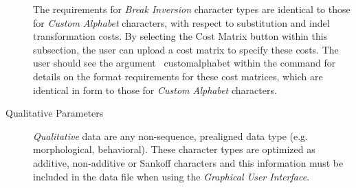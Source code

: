 \begin{description}
		\indent The requirements for \emph{Break Inversion} character types are identical to those for 
		 \emph{Custom Alphabet} characters, with respect to substitution and indel transformation costs. 
		 By selecting the Cost Matrix button within this subsection, the user can upload a 
		 cost matrix to specify these costs. The user should see the argument~
		 {customalphabet} within the command  for details on the format requirements 
		 for these cost matrices, which are identical in form to those for \emph{Custom Alphabet} characters.
 	
	\item [Qualitative Parameters] \emph{Qualitative} data are any non-sequence, prealigned 
		data type (e.g. morphological, behavioral). These character types are optimized as additive, 
		non-additive or Sankoff characters and this information must be included in the data file when 
		using the \emph{Graphical User Interface}.
	\end{description}
	
